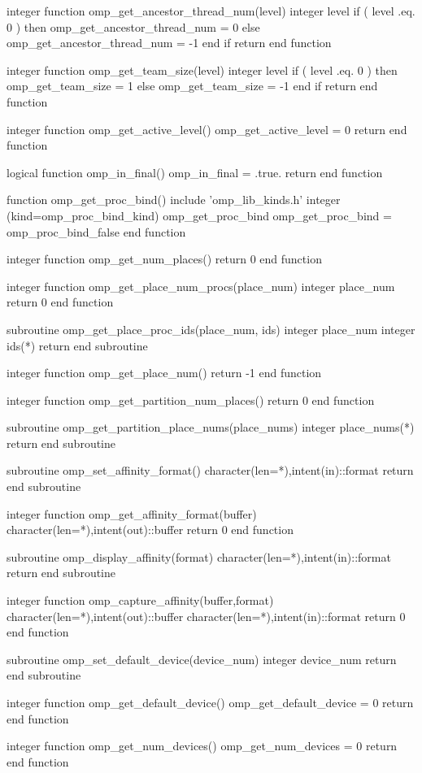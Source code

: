 {\begin{ompfFunction}
integer function omp_get_ancestor_thread_num(level)
  integer level
  if ( level .eq. 0 ) then
     omp_get_ancestor_thread_num = 0
  else
     omp_get_ancestor_thread_num = -1
  end if
  return
end function

integer function omp_get_team_size(level)
  integer level
  if ( level .eq. 0 ) then
     omp_get_team_size = 1
  else
     omp_get_team_size = -1
  end if
  return
end function

integer function omp_get_active_level()
  omp_get_active_level = 0
  return
end function

logical function omp_in_final()
  omp_in_final = .true.
  return
end function

function omp_get_proc_bind()
  include 'omp_lib_kinds.h'
  integer (kind=omp_proc_bind_kind) omp_get_proc_bind
  omp_get_proc_bind = omp_proc_bind_false
end function

integer function omp_get_num_places()
  return 0
end function

integer function omp_get_place_num_procs(place_num)
  integer place_num
  return 0
end function

subroutine omp_get_place_proc_ids(place_num, ids)
  integer place_num
  integer ids(*)
  return
end subroutine

integer function omp_get_place_num()
  return -1
end function

integer function omp_get_partition_num_places()
  return 0
end function

subroutine omp_get_partition_place_nums(place_nums)
  integer place_nums(*)
  return
end subroutine


subroutine omp_set_affinity_format()
   character(len=*),intent(in)::format
   return
end subroutine

integer function omp_get_affinity_format(buffer)
   character(len=*),intent(out)::buffer
   return 0
end function

subroutine omp_display_affinity(format)
   character(len=*),intent(in)::format
   return
end subroutine

integer function omp_capture_affinity(buffer,format)
   character(len=*),intent(out)::buffer
   character(len=*),intent(in)::format
   return 0
end function

subroutine omp_set_default_device(device_num)
  integer device_num
  return
end subroutine

integer function omp_get_default_device()
  omp_get_default_device = 0
  return
end function

integer function omp_get_num_devices()
  omp_get_num_devices = 0
  return
end function


\end{ompfFunction}}
